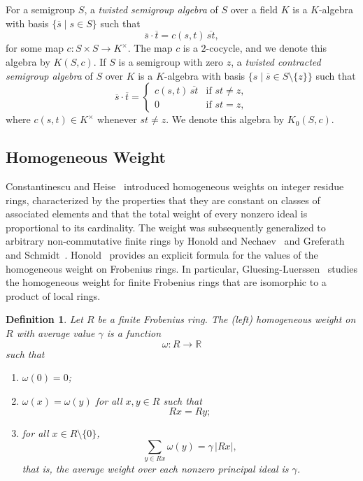 \documentclass[11pt,reqno]{amsart}
\theoremstyle{plain}
\newtheorem{ddef}[thm]{Definition}
\theoremstyle{remark}
\theoremstyle{definition}
\begin{document}
For a semigroup $S$, a \emph{twisted semigroup algebra}
of $S$ over a field $K$ is a $K$-algebra with basis $\{\overline{s} \mid s \in S\}$ such that
\[
\overline{s} \cdot \overline{t} = c(s,t)\, \overline{st},
\]
for some map $c : S \times S \to K^{\times}$.
The map $c$ is a $2$-cocycle, and we denote this algebra by $K(S,c)$.
%
%
If $S$ is a semigroup with zero $z$, a \emph{twisted contracted semigroup algebra}
of $S$ over $K$ is a $K$-algebra with basis $\{s \mid \overline{s} \in S \setminus \{z\}\}$
such that
\[
\overline{s} \cdot \overline{t} =
\begin{cases}
c(s,t)\, \overline{st} & \text{if } st \neq z,\\
0 & \text{if } st = z,
\end{cases}
\]
where $c(s,t) \in K^{\times}$ whenever $st \neq z$.
We denote this algebra by $K_0(S,c)$.


\subsection{Homogeneous Weight}\label{Hom-Wei}

Constantinescu and Heise~\cite{MR1476368} introduced
homogeneous weights on integer residue rings, characterized by the
properties that they are constant on classes of associated elements
and that the total weight of every nonzero ideal is proportional to
its cardinality. The weight was subsequently generalized to arbitrary
non-commutative finite rings by Honold and
Nechaev~\cite{Nec-Hon-Thom2001} and Greferath and
Schmidt~\cite{Gre-Sch-Hom-Wei}.
Honold~\cite{Hon-Thom2001} provides an explicit formula for the values
of the homogeneous weight on Frobenius rings.
In particular, Gluesing-Luerssen~\cite{Gluesing-Luerssen2016}
studies the homogeneous weight for finite Frobenius rings that are
isomorphic to a product of local rings.

\begin{ddef}\label{homogeneous-weight}
Let $R$ be a finite Frobenius ring.
The \emph{(left) homogeneous weight} on $R$ with average value $\gamma$
is a function
\[
\omega : R \longrightarrow \mathbb{R}
\]
such that
\begin{enumerate}
\item[(i)] $\omega(0)=0$;

\item[(ii)] $\omega(x)=\omega(y)$ for all $x,y\in R$ such that
\[
Rx = Ry;
\]

\item[(iii)] for all $x \in R \setminus \{0\}$,
\[
\sum_{y \in Rx} \omega(y) = \gamma \, |Rx|,
\]
that is, the average weight over each nonzero principal ideal is $\gamma$.
\end{enumerate}
\end{ddef}
\end{document}
